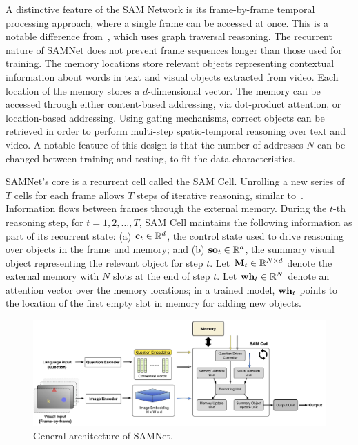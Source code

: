 A distinctive feature of the SAM Network is its frame-by-frame temporal processing approach, where a single frame can be accessed at once. This is a notable difference from~\cite{haurilet2019s}, which uses graph traversal reasoning. The recurrent nature of SAMNet does not prevent frame sequences longer than those used for training.
The memory locations store relevant objects representing contextual information about words in text and visual objects extracted from video. 
Each location of the memory stores a $d$-dimensional vector. %
The memory can be accessed through either content-based addressing, via dot-product attention, or location-based addressing. Using gating mechanisms, correct objects can be retrieved in order to perform multi-step spatio-temporal reasoning over text and video.
A notable feature of this design is that the number of addresses $N$ can be changed between training and testing, to fit the data characteristics.



SAMNet's core is a recurrent cell called the SAM Cell. Unrolling a new series of $T$ cells for each frame allows $T$ steps of iterative reasoning, similar to~\cite{hudson2018compositional}. Information flows between frames through the external memory. 
During the $t$-th reasoning step, for $t=1,2, \dots, T$, SAM Cell maintains the following information as part of its recurrent state:
(a) $\mathbf{c}_t \in \mathbb{R}^d$, the control state used to drive reasoning over objects in the frame and memory; and
(b) $\mathbf{so}_t  \in \mathbb{R}^d$, the summary visual object representing the relevant object for step $t$.
Let $\mathbf{M}_t \in  \mathbb{R}^{N \times d}$ denote the external memory with $N$ slots at the end of step $t$.
Let $\mathbf{wh}_t \in  \mathbb{R}^N$ denote an attention vector over the memory locations;
in a trained model, $\mathbf{wh}_t$ points to the location of the first empty slot in memory for adding new objects.

\begin{figure}
	\centering
	\includegraphics[width=\textwidth]{img/architecture/SAMNETmodel}
	\caption{General architecture of SAMNet.}
	\label{fig:samnet}
\end{figure}

